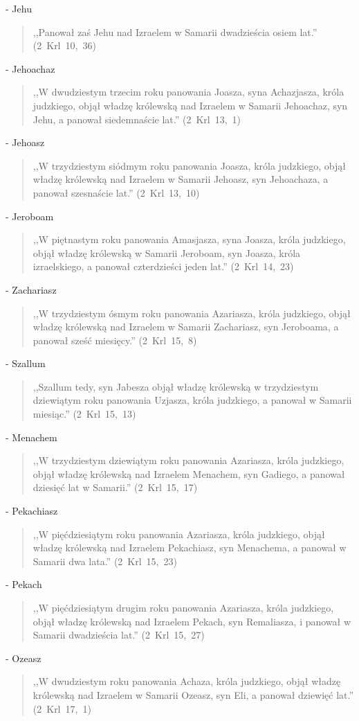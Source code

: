 \documentclass[10pt,a4paper,oneside]{article}
\begin{document}
- Jehu
\begin{quote}
,,Panował zaś Jehu nad Izraelem w Samarii dwadzieścia osiem lat.'' (2~Krl~10,~36)
\end{quote}
- Jehoachaz
\begin{quote}
,,W dwudziestym trzecim roku panowania Joasza, syna Achazjasza, króla judzkiego, objął władzę królewską nad Izraelem w Samarii Jehoachaz, syn Jehu, a panował siedemnaście lat.'' (2~Krl~13,~1)
\end{quote}
- Jehoasz
\begin{quote}
,,W trzydziestym siódmym roku panowania Joasza, króla judzkiego, objął władzę królewską nad Izraelem w Samarii Jehoasz, syn Jehoachaza, a panował szesnaście lat.'' (2~Krl~13,~10)
\end{quote}
- Jeroboam
\begin{quote}
,,W piętnastym roku panowania Amasjasza, syna Joasza, króla judzkiego, objął władzę królewską w Samarii Jeroboam, syn Joasza, króla izraelskiego, a panował czterdzieści jeden lat.'' (2~Krl~14,~23)
\end{quote}
- Zachariasz
\begin{quote}
,,W trzydziestym ósmym roku panowania Azariasza, króla judzkiego, objął władzę królewską nad Izraelem w Samarii Zachariasz, syn Jeroboama, a panował sześć miesięcy.'' (2~Krl~15,~8)
\end{quote}
- Szallum
\begin{quote}
,,Szallum tedy, syn Jabesza objął władzę królewską w trzydziestym dziewiątym roku panowania Uzjasza, króla judzkiego, a panował w Samarii miesiąc.'' (2~Krl~15,~13)
\end{quote}
- Menachem
\begin{quote}
,,W trzydziestym dziewiątym roku panowania Azariasza, króla judzkiego, objął władzę królewską nad Izraelem Menachem, syn Gadiego, a panował dziesięć lat w Samarii.'' (2~Krl~15,~17)
\end{quote}
- Pekachiasz
\begin{quote}
,,W pięćdziesiątym roku panowania Azariasza, króla judzkiego, objął władzę królewską nad Izraelem Pekachiasz, syn Menachema, a panował w Samarii dwa lata.'' (2~Krl~15,~23)
\end{quote}
- Pekach
\begin{quote}
,,W pięćdziesiątym drugim roku panowania Azariasza, króla judzkiego, objął władzę królewską nad Izraelem Pekach, syn Remaliasza, i panował w Samarii dwadzieścia lat.'' (2~Krl~15,~27)
\end{quote}
- Ozeasz
\begin{quote}
,,W dwudziestym roku panowania Achaza, króla judzkiego, objął władzę królewską nad Izraelem w Samarii Ozeasz, syn Eli, a panował dziewięć lat.'' (2~Krl~17,~1)
\end{quote}
\end{document}
